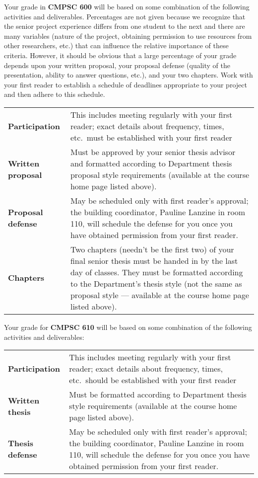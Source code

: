 Your grade in {\bf CMPSC 600} will be based on some combination of the following
activities and deliverables. Percentages are not given because we
recognize that the senior project experience differs from one student to the
next and there are many variables (nature of the project, obtaining
permission to use resources from other researchers, etc.) that can
influence the relative importance of these criteria. However, it should be
obvious that a large percentage of your grade depends upon
your written proposal, your proposal defense (quality of 
the presentation, ability to answer questions, etc.), and your two chapters.
Work with your first
reader to establish a schedule of deadlines appropriate 
to your project and then adhere to this schedule.
\begin{center}
\begin{tabular}{lp{4in}}
\bf Participation & This includes meeting regularly with your first
reader; exact details about frequency, times, etc.\ must be established with 
your first reader\\

\bf Written proposal & Must be approved by your senior thesis advisor and
formatted according to Department thesis proposal style requirements
(available at the course home page listed above).\\

\bf Proposal defense & May be scheduled only with first reader's approval;
the building coordinator, Pauline Lanzine in room 110, 
will schedule the defense for you once you have obtained
permission from your first reader.\\

\bf Chapters & Two chapters (needn't be the first two) of 
your final senior thesis must be handed in
by the last day of classes. 
They must be formatted according to
the Department's thesis style (not the same as proposal style --- available
at the course home page listed above). 

\end{tabular}
\end{center}

Your grade for {\bf CMPSC 610} will be based on 
some combination of the following activities and deliverables:
\begin{center}
\begin{tabular}{lp{4in}}
\bf Participation & This includes meeting regularly with your first
reader; exact details about frequency, times, etc.\ should be established with 
your first reader\\

\bf Written thesis & Must be
formatted according to Department thesis style requirements (available at the
course home page listed above).\\

\bf Thesis defense & May be scheduled only with first reader's approval;
the building coordinator, Pauline Lanzine in room 110, 
will schedule the defense for you once you have obtained
permission from your first reader.

\end{tabular}
\end{center}

